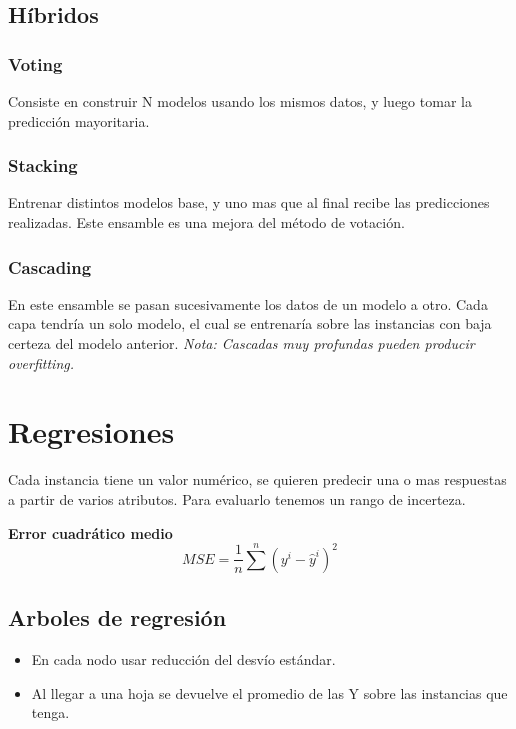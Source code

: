 \documentclass[titlepage,a4paper]{article}
\begin{document}
\subsection{Híbridos}
\subsubsection{Voting}
Consiste en construir N modelos usando los mismos datos, y luego tomar la predicción mayoritaria.


\subsubsection{Stacking}
Entrenar distintos modelos base, y uno mas que al final recibe las predicciones realizadas. Este ensamble es una mejora del método de votación.

\subsubsection{Cascading}
En este ensamble se pasan sucesivamente los datos de un modelo a otro. Cada capa tendría un solo modelo, el cual se entrenaría sobre las instancias con baja certeza del modelo anterior.
\textit{Nota: Cascadas muy profundas pueden producir overfitting.}

\section{Regresiones}

Cada instancia tiene un valor numérico, se quieren predecir una o mas respuestas a partir de varios atributos. Para evaluarlo tenemos un rango de incerteza.

\textbf{Error cuadrático medio}
\begin{equation}
    MSE = \frac{1}{n} \sum^{n} (y^{i}-\hat{y}^{i})^{2}
\end{equation}

\subsection{Arboles de regresión}
\begin{itemize}
    \item En cada nodo usar reducción del desvío estándar.
    \item Al llegar a una hoja se devuelve el promedio de las Y sobre las instancias que tenga.
\end{itemize}
\end{document}
